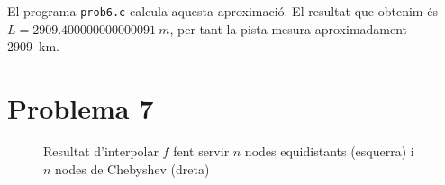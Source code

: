 \documentclass[12pt]{article}
\numberwithin{table}{section}
\numberwithin{figure}{section}
\numberwithin{equation}{section}
\begin{document}
El programa \texttt{prob6.c} calcula aquesta aproximació. El resultat que obtenim és \( L = \SI{2909.400000000000091}{m} \), per tant la pista mesura aproximadament \SI{2909}{km}.

\newpage
\section{Problema 7}
\begin{figure}[htb]
	\centering
	\sffamily \footnotesize
	
	\caption{Resultat d'interpolar \( f \) fent servir \( n \) nodes equidistants (esquerra) i \( n \) nodes de Chebyshev (dreta)}
	\label{fig:splines}	
\end{figure}
\end{document}
